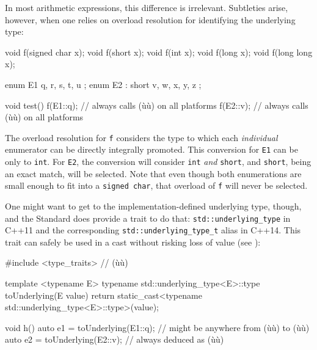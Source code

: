 In most arithmetic expressions, this difference is irrelevant.
Subtleties arise, however, when one relies on overload resolution for
identifying the underlying type:

\begin{emcppslisting}[emcppsbatch=e2]
void f(signed char x);
void f(short x);
void f(int x);
void f(long x);
void f(long long x);

enum E1         { q, r, s, t, u };
enum E2 : short { v, w, x, y, z };

void test()
{
   f(E1::q);  // always calls (ù{}ù) on all platforms
   f(E2::v);  // always calls (ù{}ù) on all platforms
}
\end{emcppslisting}

\noindent The overload resolution for \lstinline!f! considers the type to which each
\emph{individual} enumerator can be directly integrally promoted. This
conversion for \lstinline!E1! can be only to \lstinline!int!. For \lstinline!E2!,
the conversion will consider \lstinline!int! \emph{and} \lstinline!short!, and
\lstinline!short!, being an exact match, will be selected. Note that even
though both enumerations are small enough to fit into a
\lstinline!signed!~\lstinline!char!, that overload of \lstinline!f! will never be
selected.

One might want to get to the implementation-defined underlying type,
though, and the Standard does provide a trait to do that:
\lstinline!std::underlying_type! in C++11 and the corresponding
\lstinline!std::underlying_type_t! alias in C++14. This trait can safely
be used in a cast without risking loss of value (see ):

\begin{emcppslisting}[emcppsbatch=e2]
#include <type_traits>  // (ù{}ù)

template <typename E>
typename std::underlying_type<E>::type toUnderlying(E value)
{
    return static_cast<typename std::underlying_type<E>::type>(value);
}

void h()
{
    auto e1 = toUnderlying(E1::q); // might be anywhere from (ù{}ù) to (ù{}ù)
    auto e2 = toUnderlying(E2::v); // always deduced as (ù{}ù)
}
\end{emcppslisting}

